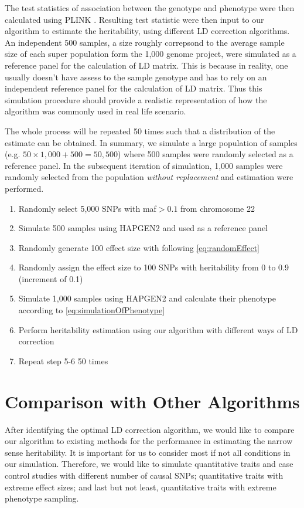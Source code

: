 		The test statistics of association between the genotype and phenotype were then calculated using PLINK \citep{Purcell2007}.
		Resulting test statistic were then input to our algorithm to estimate the heritability, using different \gls{LD} correction algorithms.
		An independent 500 samples, a size roughly correpsond to the average sample size of each super population form the 1,000 genome project,  were simulated as a reference panel for the calculation of \gls{LD} matrix.
		This is because in reality, one usually doesn't have assess to the sample genotype and has to rely on an independent reference panel for the calculation of \gls{LD} matrix. 
		Thus this simulation procedure should provide a realistic representation of how the algorithm was commonly used in real life scenario.
		
		The whole process will be repeated 50 times such that a distribution of the estimate can be obtained. 
		In summary, we simulate a large population of samples (e.g. $50\times1,000+500 = 50,500$) where 500 samples were randomly selected as a reference panel. 
		In the subsequent iteration of simulation, 1,000 samples were randomly selected from the population \textit{without replacement} and estimation were performed.
		\begin{enumerate}
			\item Randomly select 5,000 \glspl{SNP} with \gls{maf}$>0.1$ from chromosome 22
			\item Simulate 500 samples using HAPGEN2 and used as a reference panel
			\item Randomly generate 100 effect size with following \cref{eq:randomEffect}
			\item Randomly assign the effect size to 100 \glspl{SNP} with heritability from 0 to 0.9 (increment of 0.1)
			\item Simulate 1,000 samples using HAPGEN2 and calculate their phenotype according to \cref{eq:simulationOfPhenotype} 
			\item Perform heritability estimation using our algorithm with different ways of \gls{LD} correction
			\item Repeat step 5-6 50 times
		\end{enumerate}
		
		\section{Comparison with Other Algorithms}
		After identifying the optimal \gls{LD} correction algorithm, we would like to compare our algorithm to existing methods for the performance in estimating the narrow sense heritability.
		It is important for us to consider most if not all conditions in our simulation. 
		Therefore, we would like to simulate quantitative traits and case control studies with different number of causal \glspl{SNP}; quantitative traits with extreme effect sizes; and last but not least, quantitative traits with extreme phenotype sampling.
		
